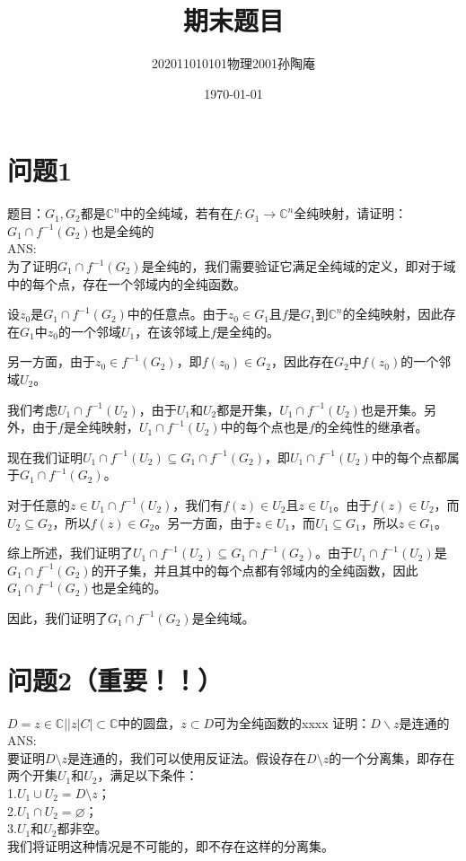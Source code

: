 \documentclass[12pt, a4paper, oneside]{ctexart}
\title{期末题目}
\date{\today}
\author{202011010101物理2001孙陶庵}
\begin{document}
\begin{spacing}{2.0}
\tableofcontents
\maketitle

\section{问题1}
题目：$G_1, G_2$都是$\mathbb{C}^n $中的全纯域，若有在$f: G_1 \to \mathbb{C} ^n$全纯映射，请证明：\\
$G_1\cap f^{-1}(G_2)$也是全纯的\\
ANS:
\\为了证明$G_1\cap f^{-1}(G_2)$是全纯的，我们需要验证它满足全纯域的定义，即对于域中的每个点，存在一个邻域内的全纯函数。

设$z_0$是$G_1\cap f^{-1}(G_2)$中的任意点。由于$z_0\in G_1$且$f$是$G_1$到$\mathbb{C}^n$的全纯映射，因此存在$G_1$中$z_0$的一个邻域$U_1$，在该邻域上$f$是全纯的。

另一方面，由于$z_0\in f^{-1}(G_2)$，即$f(z_0)\in G_2$，因此存在$G_2$中$f(z_0)$的一个邻域$U_2$。

我们考虑$U_1\cap f^{-1}(U_2)$，由于$U_1$和$U_2$都是开集，$U_1\cap f^{-1}(U_2)$也是开集。另外，由于$f$是全纯映射，$U_1\cap f^{-1}(U_2)$中的每个点也是$f$的全纯性的继承者。

现在我们证明$\displaystyle U_1\cap f^{-1}(U_2)\subseteq G_1\cap f^{-1}(G_2)$，即$U_1\cap f^{-1}(U_2)$中的每个点都属于$G_1\cap f^{-1}(G_2)$。

对于任意的$z\in U_1\cap f^{-1}(U_2)$，我们有$f(z)\in U_2$且$z\in U_1$。由于$f(z)\in U_2$，而$U_2\subseteq G_2$，所以$f(z)\in G_2$。另一方面，由于$z\in U_1$，而$U_1\subseteq G_1$，所以$z\in G_1$。

综上所述，我们证明了$\displaystyle U_1\cap f^{-1}(U_2)\subseteq G_1\cap f^{-1}(G_2)$。由于$\displaystyle U_1\cap f^{-1}(U_2)$是$G_1\cap f^{-1}(G_2)$的开子集，并且其中的每个点都有邻域内的全纯函数，因此$\displaystyle G_1\cap f^{-1}(G_2)$也是全纯的。

因此，我们证明了$G_1\cap f^{-1}(G_2)$是全纯域。


\section{问题2（重要！！）}

$\displaystyle D = {z\in \mathbb{C} ||z|C|}\subset \mathbb{C} $中的圆盘，$z\subset D$可为全纯函数的xxxx
证明：$D\backslash z$是连通的
\\
ANS:\\
要证明$D\setminus z$是连通的，我们可以使用反证法。假设存在$D\setminus z$的一个分离集，即存在两个开集$U_1$和$U_2$，满足以下条件：
\\
1.$U_1 \cup U_2 = D\setminus z$；\\
2.$U_1 \cap U_2 = \varnothing$；\\
3.$U_1$和$U_2$都非空。\\
我们将证明这种情况是不可能的，即不存在这样的分离集。


\end{spacing}
\end{document}
